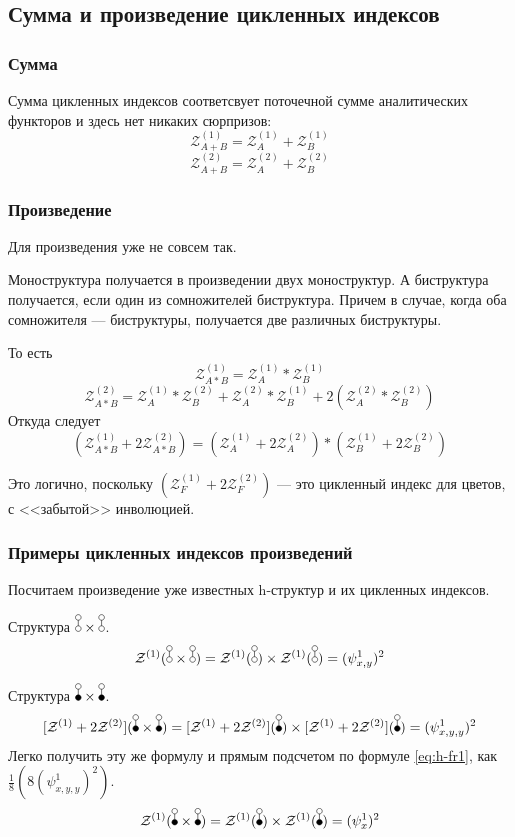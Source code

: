 \subsection{Сумма и произведение цикленных индексов}
\subsubsection{Сумма}
Сумма цикленных индексов соответсвует поточечной сумме аналитических
функторов и здесь нет никаких сюрпризов:
$$
\mathcal Z_{A + B}^{(1)} = \mathcal Z_A^{(1)} + \mathcal Z_B^{(1)}
$$
$$
\mathcal Z_{A + B}^{(2)} = \mathcal Z_A^{(2)} + \mathcal Z_B^{(2)}
$$
\subsubsection{Произведение}
Для произведения уже не совсем так. 
\begin{statement}
Моноструктура получается
в произведении двух моноструктур. А биструктура получается, если один из
сомножителей биструктура. Причем в случае, когда оба сомножителя ---
биструктуры, получается две различных биструктуры. 
\end{statement}
То есть
$$
\mathcal Z_{A * B}^{(1)} = \mathcal Z_A^{(1)} * \mathcal Z_B^{(1)}
$$
$$
\mathcal Z_{A * B}^{(2)} = 
\mathcal Z_A^{(1)} * \mathcal Z_B^{(2)} + 
\mathcal Z_A^{(2)} * \mathcal Z_B^{(1)} +
2 (\mathcal Z_A^{(2)} * \mathcal Z_B^{(2)})
$$
Откуда следует
$$
(\mathcal Z_{A * B}^{(1)} + 2\mathcal Z_{A * B}^{(2)}) = 
(\mathcal Z_A^{(1)} + 2\mathcal Z_A^{(2)}) * 
(\mathcal Z_B^{(1)} + 2\mathcal Z_B^{(2)})
$$

\begin{remark}
Это логично, поскольку $(\mathcal Z_F^{(1)} + 2\mathcal Z_F^{(2)})$ --- это
цикленный индекс для цветов, с <<забытой>> инволюцией.
\end{remark}

\subsubsection{Примеры цикленных индексов произведений}
Посчитаем произведение уже известных h-структур и их цикленных индексов.

\begin{example}
Структура $\dA \times \dA$.
$$
\Zone(\dA \times \dA) = \Zone(\dA) \times \mathcal
Z^{(1)}(\dA) = (\psi_{x, y}^1)^2
$$
\end{example}
\begin{example}
Структура $\dB \times \dB$.
$$
\Zfull(\dB \times \dB) = \Zfull(\dB) \times \Zfull(\dB) =(\psi_{x, y, y}^1)^2
$$
Легко получить эту же формулу и прямым подсчетом по формуле \ref{eq:h-fr1}, как
$\frac{1}{8}(8(\psi_{x, y, y}^1)^2)$.
$$
\Zone(\dB \times \dB) = \Zone(\dB) \times \mathcal
Z^{(1)}(\dB) =(\psi_{x}^1)^2
$$
\end{example}

